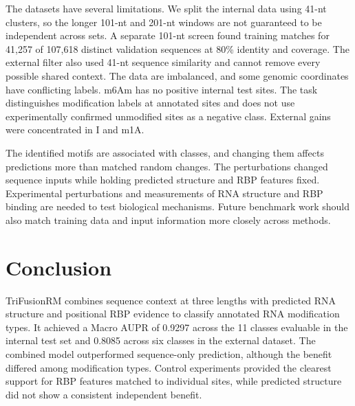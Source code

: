 \documentclass[unnumsec,webpdf,contemporary,large]{oup-authoring-template}
\begin{document}
The datasets have several limitations. We split the internal data using 41-nt clusters, so the longer 101-nt and 201-nt windows are not guaranteed to be independent across sets. A separate 101-nt screen found training matches for 41,257 of 107,618 distinct validation sequences at 80\% identity and coverage. The external filter also used 41-nt sequence similarity and cannot remove every possible shared context. The data are imbalanced, and some genomic coordinates have conflicting labels. m6Am has no positive internal test sites. The task distinguishes modification labels at annotated sites and does not use experimentally confirmed unmodified sites as a negative class. External gains were concentrated in I and m1A.

The identified motifs are associated with classes, and changing them affects predictions more than matched random changes. The perturbations changed sequence inputs while holding predicted structure and RBP features fixed. Experimental perturbations and measurements of RNA structure and RBP binding are needed to test biological mechanisms. Future benchmark work should also match training data and input information more closely across methods. 

\section{Conclusion}

TriFusionRM combines sequence context at three lengths with predicted RNA structure and positional RBP evidence to classify annotated RNA modification types. It achieved a Macro AUPR of 0.9297 across the 11 classes evaluable in the internal test set and 0.8085 across six classes in the external dataset. The combined model outperformed sequence-only prediction, although the benefit differed among modification types. Control experiments provided the clearest support for RBP features matched to individual sites, while predicted structure did not show a consistent independent benefit. 
\end{document}
